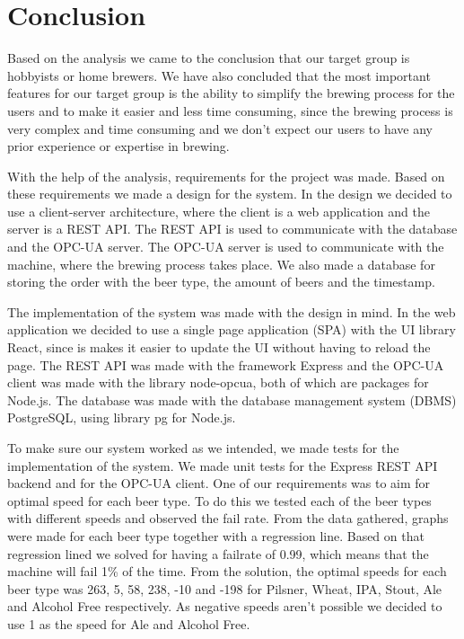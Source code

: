 \section{Conclusion}
Based on the analysis we came to the conclusion that our target group is hobbyists or home brewers.
We have also concluded that the most important features for our target group is the ability to simplify the brewing process for the users and
to make it easier and less time consuming, since the brewing process is very complex and time consuming
and we don't expect our users to have any prior experience or expertise in brewing.\newline

With the help of the analysis, requirements for the project was made.
Based on these requirements we made a design for the system.
In the design we decided to use a client-server architecture, where the client is a web application and the server is a REST API.
The REST API is used to communicate with the database and the OPC-UA server.
The OPC-UA server is used to communicate with the machine, where the brewing process takes place.
We also made a database for storing the order with the beer type, the amount of beers and the timestamp.\newline

The implementation of the system was made with the design in mind.
In the web application we decided to use a single page application (SPA) with the UI library React,
since is makes it easier to update the UI without having to reload the page.
The REST API was made with the framework Express and the OPC-UA client was made with the library node-opcua, both of which are packages for Node.js.
The database was made with the database management system (DBMS) PostgreSQL, using library pg for Node.js.\newline

To make sure our system worked as we intended, we made tests for the implementation of the system.
We made unit tests for the Express REST API backend and for the OPC-UA client.
One of our requirements was to aim for optimal speed for each beer type.
To do this we tested each of the beer types with different speeds and observed the fail rate.
From the data gathered, graphs were made for each beer type together with a regression line.
Based on that regression lined we solved for having a failrate of 0.99, which means that the machine will fail 1\% of the time.
From the solution, the optimal speeds for each beer type was 263, 5, 58, 238, -10 and -198 for Pilsner, Wheat, IPA, Stout, Ale and Alcohol Free respectively.
As negative speeds aren't possible we decided to use 1 as the speed for Ale and Alcohol Free.\newline